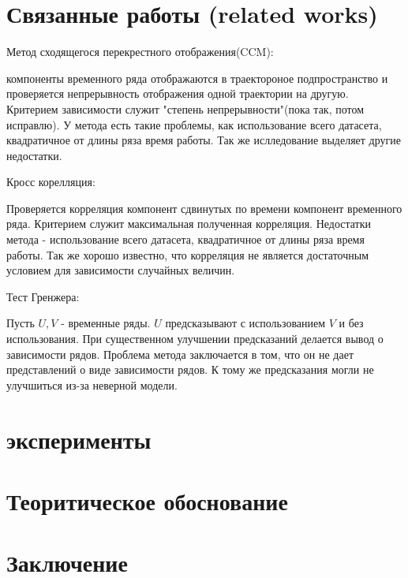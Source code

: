 \documentclass[12pt, twoside]{article}
\begin{document}
\section{Связанные работы (related works)}
	Метод сходящегося перекрестного отображения(CCM)\citep{CCM}:
	
		компоненты временного ряда отображаются в траектороное подпространство и проверяется непрерывность отображения одной траектории на другую. Критерием зависимости служит "степень непрерывности"(пока так, потом исправлю). У метода есть такие проблемы, как использование всего датасета, квадратичное от длины ряза время работы. Так же ислледование \citep{CCM_PA} выделяет другие недостатки.
	
	Кросс корелляция:
	
		Проверяется корреляция компонент сдвинутых по времени компонент временного ряда. Критерием служит максимальная полученная корреляция. Недостатки метода - использование всего датасета, квадратичное от длины ряза время работы. Так же хорошо известно, что корреляция не является достаточным условием для зависимости случайных величин.
	
	Тест Гренжера:
	
		Пусть $U, V$ - временные ряды. $U$ предсказывают с использованием $V$ и без использования. При существенном улучшении предсказаний делается вывод о зависимости рядов. Проблема метода заключается в том, что он не дает представлений о виде зависимости рядов. К тому же предсказания могли не улучшиться из-за неверной модели.
	
\section{эксперименты}
	
\section{Теоритическое обоснование}
	
\section{Заключение}



	
	
\end{document}
